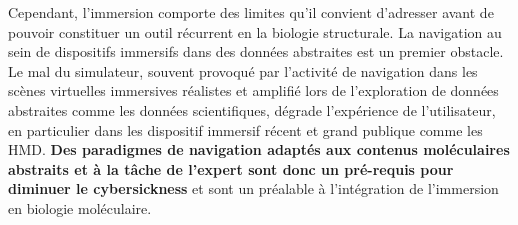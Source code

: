 

Cependant, l'immersion comporte des limites qu'il convient d'adresser avant de pouvoir constituer un outil récurrent en la biologie structurale. La navigation au sein de dispositifs immersifs dans des données abstraites est un premier obstacle. Le mal du simulateur, souvent provoqué par l'activité de navigation dans les scènes virtuelles immersives réalistes et amplifié lors de l'exploration de données abstraites comme les données scientifiques, dégrade l'expérience de l'utilisateur, en particulier dans les dispositif immersif récent et grand publique comme les HMD. \textbf{Des paradigmes de navigation adaptés aux contenus moléculaires abstraits et à la tâche de l'expert sont donc un pré-requis pour diminuer le cybersickness} et sont un préalable à l'intégration de l'immersion en biologie moléculaire.

